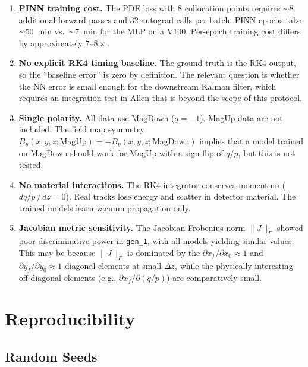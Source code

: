 \documentclass[a4paper,11pt]{article}
\newcommand{\SI}[2]{#1~#2}
\newcommand{\minute}{min}
\newcommand{\dz}{\Delta z}
\begin{document}
\begin{enumerate}
  \item \textbf{PINN training cost.}
    The PDE loss with 8 collocation points requires $\sim$8 additional
    forward passes and 32 autograd calls per batch.  PINN epochs take
    $\sim$\SI{50}{\minute} vs.\ $\sim$\SI{7}{\minute} for the MLP on a
    V100.  Per-epoch training cost differs by approximately $7\text{--}8\times$.

  \item \textbf{No explicit RK4 timing baseline.}
    The ground truth is the RK4 output, so the ``baseline error'' is zero
    by definition.  The relevant question is whether the NN error is small
    enough for the downstream Kalman filter, which requires an integration
    test in Allen that is beyond the scope of this protocol.

  \item \textbf{Single polarity.}
    All data use MagDown ($q = -1$).  MagUp data are not included.  The
    field map symmetry $B_y(x, y, z; \text{MagUp}) = -B_y(x, y, z;
    \text{MagDown})$ implies that a model trained on MagDown should work
    for MagUp with a sign flip of $q/p$, but this is not tested.

  \item \textbf{No material interactions.}
    The RK4 integrator conserves momentum ($dq/p\,/\,dz = 0$).  Real
    tracks lose energy and scatter in detector material.  The trained
    models learn vacuum propagation only.

  \item \textbf{Jacobian metric sensitivity.}
    The Jacobian Frobenius norm $\|J\|_F$ showed poor discriminative
    power in \texttt{gen\_1}, with all models yielding similar values.
    This may be because $\|J\|_F$ is dominated by the $\partial x_f /
    \partial x_0 \approx 1$ and $\partial y_f / \partial y_0 \approx 1$
    diagonal elements at small $\dz$, while the physically interesting
    off-diagonal elements (e.g., $\partial x_f / \partial (q/p)$) are
    comparatively small.
\end{enumerate}

\section{Reproducibility}
\label{sec:reproducibility}

\subsection{Random Seeds}
\end{document}
